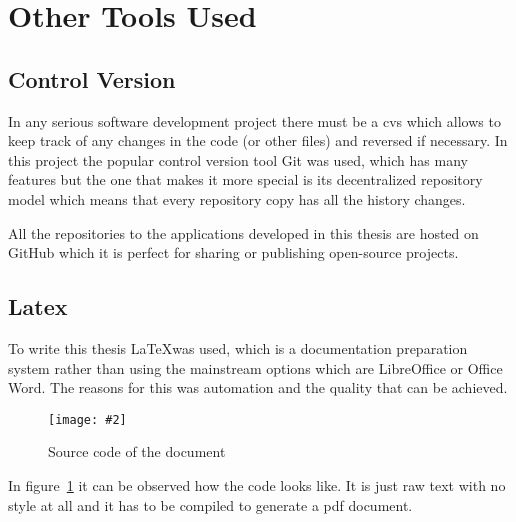 \documentclass[hidelinks,11pt,a4paper,oneside,article]{memoir}
\newcommand{\putimage}[3][10] %
{
\begin{figure}[h]
	\centering
	\captionsetup{justification=centering}
	\texttt{[image: \#2]}
	\caption{#3}
	\label{fig:#2}
\end{figure}
}
\begin{document}

\section{Other Tools Used}

\subsection{Control Version}
In any serious software development project there must be a \gls{cvs} which allows to keep track of any changes in the code (or other files) and reversed if necessary. In this project the popular control version tool Git was used, which has many features but the one that makes it more special is its decentralized repository model which means that every repository copy has all the history changes.

All the repositories to the applications developed in this thesis are hosted on GitHub which it is perfect for sharing or publishing open-source projects.

\subsection{Latex}
To write this thesis \LaTeX was used, which is a documentation preparation system rather than using the mainstream options which are LibreOffice or Office Word. The reasons for this was automation and the quality that can be achieved.

    \putimage{latex-look}{Source code of the document}
    
In figure~\ref{fig:latex-look} it can be observed how the code looks like. It is just raw text with no style at all and it has to be compiled to generate a \gls{pdf} document.
\end{document}
